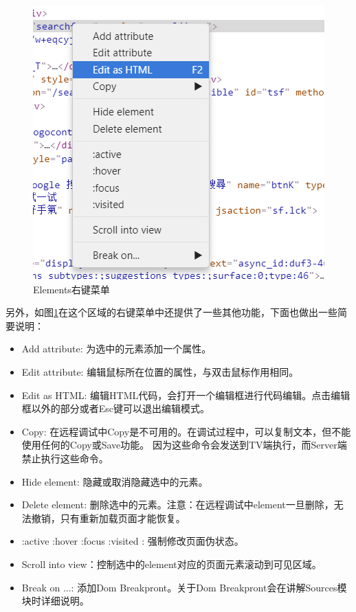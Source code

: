 \begin{figure}[H] 
\centering 
\includegraphics{image/devtools_study/element_right_menu.png} 
\caption{Elements右键菜单} \label{fig:element_right_menu} 
\end{figure}

另外，如图\ref{fig:element_right_menu}在这个区域的右键菜单中还提供了一些其他功能，下面也做出一些简要说明：
\begin{itemize}
\item Add attribute: 为选中的元素添加一个属性。
\item Edit attribute: 编辑鼠标所在位置的属性，与双击鼠标作用相同。
\item Edit as HTML: 编辑HTML代码，会打开一个编辑框进行代码编辑。点击编辑框以外的部分或者Esc键可以退出编辑模式。
\item Copy: 在远程调试中Copy是不可用的。在调试过程中，可以复制文本，但不能使用任何的Copy或Save功能。
因为这些命令会发送到TV端执行，而Server端禁止执行这些命令。
\item Hide element: 隐藏或取消隐藏选中的元素。
\item Delete element: 删除选中的元素。注意：在远程调试中element一旦删除，无法撤销，只有重新加载页面才能恢复。
\item :active :hover :focus :visited : 强制修改页面伪状态。
\item Scroll into view：控制选中的element对应的页面元素滚动到可见区域。
\item Break on ...: 添加Dom Breakpront。关于Dom Breakpront会在讲解Sources模块时详细说明。
\end{itemize}


